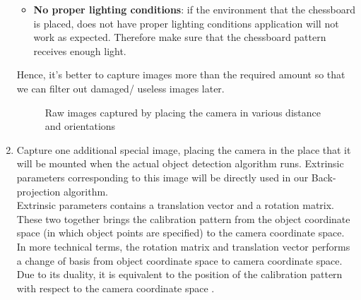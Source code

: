 \documentclass[a4paper,12pt]{report}%
\begin{document}
\begin{enumerate}
\begin{itemize}
		\item \textbf{No proper lighting conditions}: if the environment that the  chessboard is placed, does not have proper lighting conditions application will not work as expected. Therefore make sure that the chessboard pattern receives enough light.
		
	\end{itemize}
	Hence, it's better to capture images more than the required amount so that we can filter out damaged/ useless images later. 
	
	\begin{figure}[H]
		\centering
		\caption{Raw images captured by placing the camera in various distance and orientations}
		\label{fig:rawimages}
	\end{figure}
	
	\item Capture one additional special image, placing the camera in the place that it will be mounted when the actual object detection algorithm runs. Extrinsic parameters\cite{hartley_zisserman_2004} corresponding to this image will be directly used in our Back-projection algorithm.\\
	
	Extrinsic parameters contains a translation vector and a rotation matrix. These two together brings the calibration pattern from the object coordinate space (in which object points are specified) to the camera coordinate space. In more technical terms, the rotation matrix and translation vector performs a change of basis from object coordinate space to camera coordinate space. Due to its duality, it is equivalent to the position of the calibration pattern with respect to the camera coordinate space \cite{backproject:_nodate-1}.\\
	

\end{enumerate}
\end{document}
